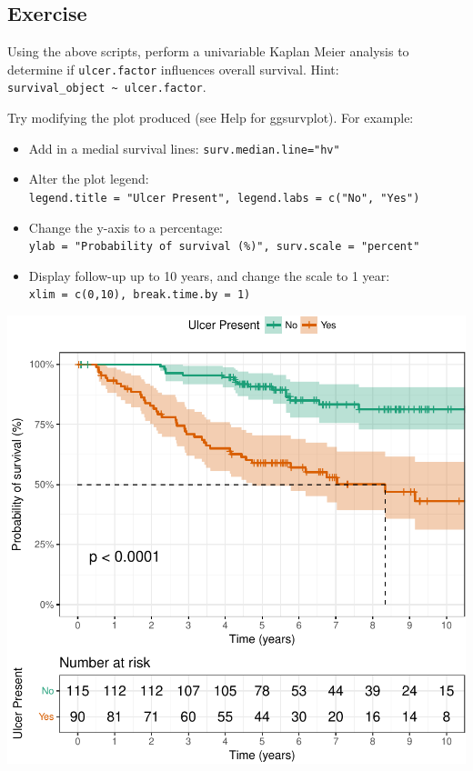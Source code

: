 \documentclass[12pt,]{krantz}
\providecommand{\tightlist}{%
  \setlength{\itemsep}{0pt}\setlength{\parskip}{0pt}}
\theoremstyle{definition}
\theoremstyle{definition}
\theoremstyle{definition}
\theoremstyle{remark}
\begin{document}
\hypertarget{exercise-30}{%
\subsection{Exercise}\label{exercise-30}}

Using the above scripts, perform a univariable Kaplan Meier analysis to
determine if \texttt{ulcer.factor} influences overall survival. Hint:
\texttt{survival\_object\ \textasciitilde{}\ ulcer.factor}.

Try modifying the plot produced (see Help for ggsurvplot). For example:

\begin{itemize}
\tightlist
\item
  Add in a medial survival lines: \texttt{surv.median.line="hv"}
\item
  Alter the plot legend:
  \texttt{legend.title\ =\ "Ulcer\ Present",\ legend.labs\ =\ c("No",\ "Yes")}
\item
  Change the y-axis to a percentage:
  \texttt{ylab\ =\ "Probability\ of\ survival\ (\%)",\ surv.scale\ =\ "percent"}
\item
  Display follow-up up to 10 years, and change the scale to 1 year:
  \texttt{xlim\ =\ c(0,10),\ break.time.by\ =\ 1)}
\end{itemize}

\includegraphics{10_survival_files/figure-latex/unnamed-chunk-8-1.pdf}
\end{document}
